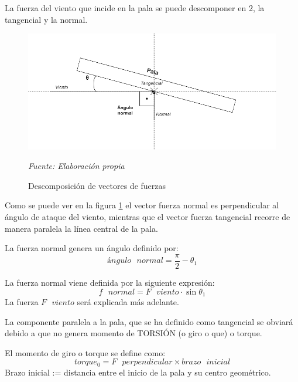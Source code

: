 La fuerza del viento que incide en la pala se puede descomponer en 2, la tangencial y la normal. \\

    \textbf{}
    \begin{figure}[H]
    \centering
    \includegraphics[width=1\textwidth]{images/dibujo fuerzas.drawio.png}
    \caption{Descomposición de vectores de fuerzas}
    \textit{Fuente: Elaboración propia}
    \label{fig:dibujo_fuerzas}
\end{figure}


Como se puede ver en la figura \ref{fig:dibujo_fuerzas} el vector fuerza normal es perpendicular al ángulo de ataque del viento, mientras que el vector fuerza tangencial recorre de manera paralela la línea central de la pala.

 \begin{definicion}
 La fuerza normal genera un ángulo definido por:
 $$ ángulo \text{ } normal = \dfrac{\pi}{2} - \theta_1 $$
 
 \end{definicion}

 \begin{definicion}
 La fuerza normal viene definida por la siguiente expresión:
  $$ f \text{ } normal = F \text{ } viento \cdot \sin{\theta_1}$$
   La fuerza $F \text{ } viento$ será explicada más adelante.
  \label{def:fuerza_normal_inicial}
 \end{definicion}
 
  La componente paralela a la pala, que se ha definido como tangencial se obviará debido a que no genera momento de TORSIÓN (o giro o que) o torque. 
  
  \begin{definicion}
El momento de giro o torque se define como:
 $$ torque_0 = F \text{ } perpendicular \times brazo \text{ } inicial$$
 \label{def:torque_inicial}
 Brazo inicial := distancia entre el inicio de la pala y su centro geométrico. \\
 \end{definicion}
 

